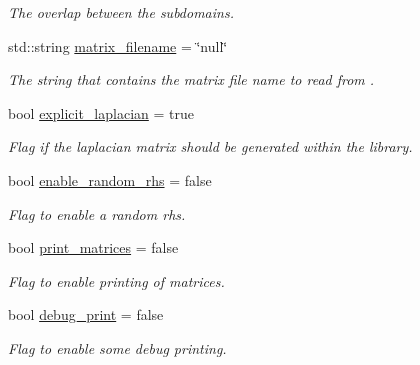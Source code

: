 \begin{DoxyCompactItemize}
\begin{DoxyCompactList}\small\item\em The overlap between the subdomains. \end{DoxyCompactList}\item 
\mbox{\label{structschwz_1_1Settings_a30bee3efa70fac8650d1c2837f1ba9c8}} 
std\+::string \hyperlink{structschwz_1_1Settings_a30bee3efa70fac8650d1c2837f1ba9c8}{matrix\+\_\+filename} = \char`\"{}null\char`\"{}
\begin{DoxyCompactList}\small\item\em The string that contains the matrix file name to read from . \end{DoxyCompactList}\item 
bool \hyperlink{structschwz_1_1Settings_a2af5f07901df047e305c456b2f97e774}{explicit\+\_\+laplacian} = true
\begin{DoxyCompactList}\small\item\em Flag if the laplacian matrix should be generated within the library. \end{DoxyCompactList}\item 
\mbox{\label{structschwz_1_1Settings_a04760b39513414af70498808c0a6b317}} 
bool \hyperlink{structschwz_1_1Settings_a04760b39513414af70498808c0a6b317}{enable\+\_\+random\+\_\+rhs} = false
\begin{DoxyCompactList}\small\item\em Flag to enable a random rhs. \end{DoxyCompactList}\item 
\mbox{\label{structschwz_1_1Settings_afdf517a873a887a21a03b75c1011f903}} 
bool \hyperlink{structschwz_1_1Settings_afdf517a873a887a21a03b75c1011f903}{print\+\_\+matrices} = false
\begin{DoxyCompactList}\small\item\em Flag to enable printing of matrices. \end{DoxyCompactList}\item 
\mbox{\label{structschwz_1_1Settings_a5573fab398e7bba73e793eea06aa1e11}} 
bool \hyperlink{structschwz_1_1Settings_a5573fab398e7bba73e793eea06aa1e11}{debug\+\_\+print} = false
\begin{DoxyCompactList}\small\item\em Flag to enable some debug printing. \end{DoxyCompactList}\item 

\end{DoxyCompactItemize}
